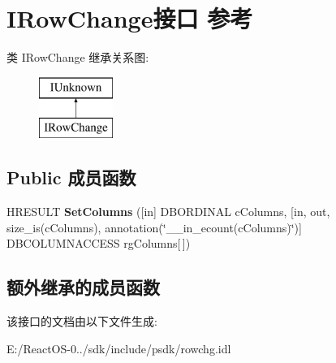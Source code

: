\hypertarget{interface_i_row_change}{}\section{I\+Row\+Change接口 参考}
\label{interface_i_row_change}
类 I\+Row\+Change 继承关系图\+:\begin{figure}[H]
\begin{center}
\leavevmode
\includegraphics[height=2.000000cm]{interface_i_row_change}
\end{center}
\end{figure}
\subsection*{Public 成员函数}
\begin{DoxyCompactItemize}
\item 
\mbox{\label{interface_i_row_change_acb44dfbe44f8c243b685b90db172f192}} 
H\+R\+E\+S\+U\+LT {\bfseries Set\+Columns} (\mbox{[}in\mbox{]} D\+B\+O\+R\+D\+I\+N\+AL c\+Columns, \mbox{[}in, out, size\+\_\+is(c\+Columns), annotation(\char`\"{}\+\_\+\+\_\+in\+\_\+ecount(c\+Columns)\char`\"{})\mbox{]} D\+B\+C\+O\+L\+U\+M\+N\+A\+C\+C\+E\+SS rg\+Columns\mbox{[}$\,$\mbox{]})
\end{DoxyCompactItemize}
\subsection*{额外继承的成员函数}


该接口的文档由以下文件生成\+:\begin{DoxyCompactItemize}
\item 
E\+:/\+React\+O\+S-\/0../sdk/include/psdk/rowchg.\+idl\end{DoxyCompactItemize}
